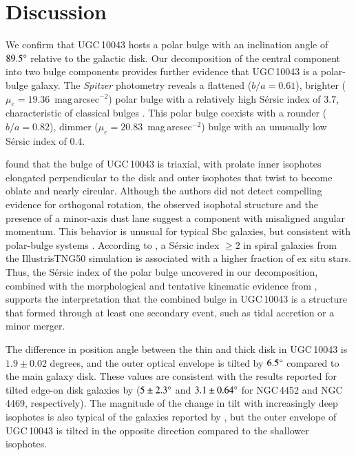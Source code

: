 \documentclass[letter]{aa}
\begin{document}
\section{Discussion} \label{sec:discuss}

We confirm that UGC\,10043 hosts a polar bulge with an inclination angle of $89.5\degree$ relative to the galactic disk. Our decomposition of the central component into two bulge components provides further evidence that UGC\,10043 is a polar-bulge galaxy. The {\it Spitzer} photometry reveals a flattened ($b/a=0.61$), brighter ($\mu_e=19.36$~mag\,arcsec$^{-2}$) polar bulge with a relatively high S\'ersic index of $3.7$, characteristic of classical bulges \citep{2008AJ....136..773F}. This polar bulge coexists with a rounder ($b/a=0.82$), dimmer ($\mu_e=20.83$~mag\,arcsec$^{-2}$) bulge with an unusually low S\'ersic index of $0.4$. 

\citet{2004AJ....128..137M} found that the bulge of UGC\,10043 is triaxial, with prolate inner isophotes elongated perpendicular to the disk and outer isophotes that twist to become oblate and nearly circular. Although the authors did not detect compelling evidence for orthogonal rotation, the observed isophotal structure and the presence of a minor-axis dust lane suggest a component with misaligned angular momentum. This behavior is unusual for typical Sbc galaxies, but consistent with polar-bulge systems \citep{1999ApJ...519L.127B,2000A&A...360..439S,2002A&A...383..390R,2003A&A...408..873C, 2012AstBu..67..147M, 2015AstL...41..748R}. According to \citet{2022MNRAS.512.2537G}, a S\'ersic index $\ge 2$ in spiral galaxies from the IllustrisTNG50 simulation is associated with a higher fraction of ex situ stars. Thus, the S\'ersic index of the polar bulge uncovered in our decomposition, combined with the morphological and tentative kinematic evidence from \citet{2004AJ....128..137M}, supports the interpretation that the combined bulge in UGC\,10043 is a structure that formed through at least one secondary event, such as tidal accretion or a minor merger.

The difference in position angle between the thin and thick disk in UGC\,10043 is $1.9 \pm 0.02$ degrees, and the outer optical envelope is tilted by $6.5\degree$ compared to the main galaxy disk. These values are consistent with the results reported for tilted edge-on disk galaxies by \citet{2020MNRAS.497.2039M} ($5\pm2.3\degree$ and $3.1\pm0.64\degree$ for NGC\,4452 and NGC\,4469, respectively). The magnitude of the change in tilt with increasingly deep isophotes is also typical of the galaxies reported by \citet{2020MNRAS.497.2039M}, but the outer envelope of UGC\,10043 is tilted in the opposite direction compared to the shallower isophotes. 
\end{document}
